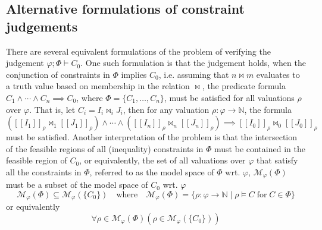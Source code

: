 \subsection{Alternative formulations of constraint judgements}\label{sec:cjalternativeform}
There are several equivalent formulations of the problem of verifying the judgement $\varphi;\Phi\vDash C_0$. One such formulation is that the judgement holds, when the conjunction of constraints in $\Phi$ implies $C_0$, i.e. assuming that $n \bowtie m$ evaluates to a truth value based on membership in the relation $\bowtie$, the predicate formula $C_1 \land \cdots \land C_n \implies C_0$, where $\Phi = \{C_1,\dots,C_n\}$, must be satisfied for all valuations $\rho$ over $\varphi$. That is, let $C_i = I_i \bowtie_i J_i$, then for any valuation $\rho : \varphi \rightarrow \mathbb{N}$, the formula $([\![I_1]\!]_\rho \bowtie_1 [\![J_1]\!]_\rho) \land \cdots \land ([\![I_n]\!]_\rho \bowtie_n [\![J_n]\!]_\rho) \implies [\![I_0]\!]_\rho \bowtie_0 [\![J_0]\!]_\rho$ must be satisfied. Another interpretation of the problem is that the intersection of the feasible regions of all (inequality) constraints in $\Phi$ must be contained in the feasible region of $C_0$, or equivalently, the set of all valuations over $\varphi$ that satisfy all the constraints in $\Phi$, referred to as the model space of $\Phi$ wrt. $\varphi$, $\mathcal{M}_\varphi(\Phi)$ must be a subset of the model space of $C_0$ wrt. $\varphi$
\begin{equation*}
    \mathcal{M}_\varphi(\Phi) \subseteq \mathcal{M}_\varphi(\{C_0\})\quad\text{where}\quad\mathcal{M}_\varphi(\Phi)=\{\rho : \varphi \rightarrow \mathbb{N} \mid \rho \vDash C\;\text{for}\; C \in \Phi\}
\end{equation*}
or equivalently
\begin{equation*}
    \forall \rho \in \mathcal{M}_\varphi(\Phi) (\rho \in \mathcal{M}_\varphi(\{C_0\}))
\end{equation*}

